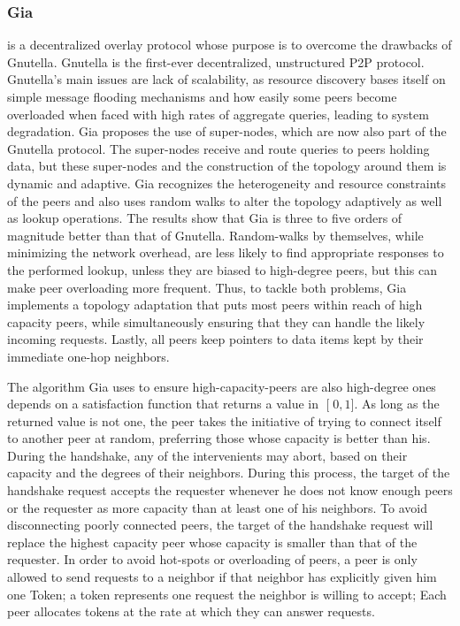\documentclass[runningheads]{llncs}
\begin{document}
\subsubsection{Gia} \cite{gia} is a decentralized overlay protocol whose purpose is to overcome the drawbacks of Gnutella\cite{gnutella-rfc, gnutella-cs}. Gnutella is the first-ever decentralized, unstructured P2P protocol. Gnutella's main issues are lack of scalability, as resource discovery bases itself on simple message flooding mechanisms and how easily some peers become overloaded when faced with high rates of aggregate queries, leading to system degradation. Gia proposes the use of super-nodes, which are now also part of the Gnutella protocol. The super-nodes receive and route queries to peers holding data, but these super-nodes and the construction of the topology around them is dynamic and adaptive. Gia recognizes the heterogeneity and resource constraints of the peers and also uses random walks to alter the topology adaptively as well as lookup operations. The results show that Gia is three to five orders of magnitude better than that of Gnutella. Random-walks by themselves, while minimizing the network overhead, are less likely to find appropriate responses to the performed lookup, unless they are biased to high-degree peers, but this can make peer overloading more frequent. Thus, to tackle both problems, Gia implements a topology adaptation that puts most peers within reach of high capacity peers, while simultaneously ensuring that they can handle the likely incoming requests. Lastly, all peers keep pointers to data items kept by their immediate one-hop neighbors.

The algorithm Gia uses to ensure high-capacity-peers are also high-degree ones depends on a satisfaction function that returns a value in $\mathclose[0,1\mathclose]$. As long as the returned value is not one, the peer takes the initiative of trying to connect itself to another peer at random, preferring those whose capacity is better than his. During the handshake, any of the intervenients may abort, based on their capacity and the degrees of their neighbors. During this process, the target of the handshake request accepts the requester whenever he does not know enough peers or the requester as more capacity than at least one of his neighbors. To avoid disconnecting poorly connected peers, the target of the handshake request will replace the highest capacity peer whose capacity is smaller than that of the requester. In order to avoid hot-spots or overloading of peers, a peer is only allowed to send requests to a neighbor if that neighbor has explicitly given him one Token; a token represents one request the neighbor is willing to accept; Each peer allocates tokens at the rate at which they can answer requests.
\end{document}
